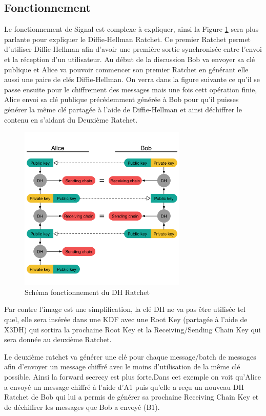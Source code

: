 \subsection{Fonctionnement}
Le fonctionnement de Signal est complexe à expliquer, ainsi la Figure \ref{fig:signal} sera plus parlante pour expliquer le Diffie-Hellman Ratchet. Ce premier Ratchet permet d'utiliser Diffie-Hellman afin d'avoir une première sortie synchronisée entre l'envoi et la réception d'un utilisateur. Au début de la discussion Bob va envoyer sa clé publique et Alice va pouvoir commencer son premier Ratchet en générant elle aussi une paire de clés Diffie-Hellman. On verra dans la figure suivante ce qu'il se passe ensuite pour le chiffrement des messages mais une fois cett opération finie, Alice envoi sa clé publique précédemment générée à Bob pour qu'il puisses générer la même clé partagée à l'aide de Diffie-Hellman et ainsi déchiffrer le contenu en s'aidant du Deuxième Ratchet.

\begin{figure}[h!]
	\centering
	\includegraphics[width=8cm]{images/signalFonctionnement.png}
	\caption{Schéma fonctionnement du DH Ratchet\cite{doubleratchet}}
	\label{fig:signal}
\end{figure}

Par contre l'image est une simplification, la clé DH ne va pas être utilisée tel quel, elle sera insérée dans une KDF avec une Root Key (partagée à l'aide de X3DH) qui sortira la prochaine Root Key et la Receiving/Sending Chain Key qui sera donnée au deuxième Ratchet.

Le deuxième ratchet va générer une clé pour chaque message/batch de messages afin d'envoyer un message chiffré avec le moins d'utilisation de la même clé possible. Ainsi la forward secrecy est plus forte.Dans cet exemple on voit qu'Alice a envoyé un message chiffré à l'aide d'A1 puis qu'elle a reçu un nouveau DH Ratchet de Bob qui lui a permis de générer sa prochaine Receiving Chain Key et de déchiffrer les messages que Bob a envoyé (B1).

